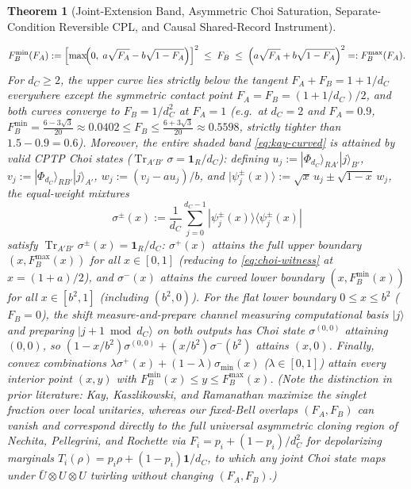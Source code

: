 \documentclass[11pt,a4paper]{article}
\newtheorem{theorem}{Theorem}
\theoremstyle{definition}
\theoremstyle{remark}
\newcommand{\Tr}{\operatorname{Tr}}
\newcommand{\1}{\mathbf{1}}
\begin{document}
\begin{theorem}[Joint-Extension Band, Asymmetric Choi Saturation, Separate-Condition Reversible CPL, and Causal Shared-Record Instrument]
\begin{enumerate}
  \begin{equation}\label{eq:kay-curved}
    F_B^{\min}(F_A) := \Bigl[\max\!\Bigl(0,\; a\sqrt{F_A} - b\sqrt{1 - F_A}\Bigr)\Bigr]^2
    \;\le\; F_B \;\le\;
    \Bigl(a\sqrt{F_A} + b\sqrt{1 - F_A}\Bigr)^2 =: F_B^{\max}(F_A).
  \end{equation}
  For $d_C \ge 2$, the upper curve lies strictly below the tangent $F_A + F_B = 1 + 1/d_C$ everywhere except the symmetric contact point $F_A = F_B = (1+1/d_C)/2$, and both curves converge to $F_B = 1/d_C^2$ at $F_A = 1$ (e.g.\ at $d_C = 2$ and $F_A = 0.9$, $F_B^{\min} = \frac{6-3\sqrt{3}}{20} \approx 0.0402 \le F_B \le \frac{6+3\sqrt{3}}{20} \approx 0.5598$, strictly tighter than $1.5 - 0.9 = 0.6$). Moreover, the \emph{entire} shaded band \eqref{eq:kay-curved} is attained by valid CPTP Choi states ($\Tr_{A'B'}\sigma = \1_R/d_C$): defining $u_j := |\Phi_{d_C}\rangle_{RA'}|j\rangle_{B'}$, $v_j := |\Phi_{d_C}\rangle_{RB'}|j\rangle_{A'}$, $w_j := (v_j - a u_j)/b$, and $|\psi_j^\pm(x)\rangle := \sqrt{x}\,u_j \pm \sqrt{1-x}\,w_j$, the equal-weight mixtures
  \begin{equation}\label{eq:asym-choi}
    \sigma^\pm(x) := \frac{1}{d_C}\sum_{j=0}^{d_C-1} |\psi_j^\pm(x)\rangle\langle\psi_j^\pm(x)|
  \end{equation}
  satisfy $\Tr_{A'B'}\sigma^\pm(x) = \1_R/d_C$: $\sigma^+(x)$ attains the full upper boundary $(x, F_B^{\max}(x))$ for all $x\in[0,1]$ (reducing to \eqref{eq:choi-witness} at $x=(1+a)/2$), and $\sigma^-(x)$ attains the curved lower boundary $(x, F_B^{\min}(x))$ for all $x\in[b^2,1]$ (including $(b^2,0)$). For the flat lower boundary $0\le x\le b^2$ ($F_B=0$), the shift measure-and-prepare channel measuring computational basis $|j\rangle$ and preparing $|j+1\bmod d_C\rangle$ on both outputs has Choi state $\sigma^{(0,0)}$ attaining $(0,0)$, so $(1-x/b^2)\sigma^{(0,0)} + (x/b^2)\sigma^-(b^2)$ attains $(x,0)$. Finally, convex combinations $\lambda\sigma^+(x) + (1-\lambda)\sigma_{\min}(x)$ ($\lambda\in[0,1]$) attain every interior point $(x,y)$ with $F_B^{\min}(x)\le y\le F_B^{\max}(x)$. (Note the distinction in prior literature: Kay, Kaszlikowski, and Ramanathan \cite[Eq.~(6), Fig.~1]{Kay2009} maximize the singlet fraction over local unitaries, whereas our fixed-Bell overlaps $(F_A,F_B)$ can vanish and correspond directly to the full universal asymmetric cloning region of Nechita, Pellegrini, and Rochette \cite[\S 7, Theorem~6, Fig.~2]{Nechita2021} via $F_i = p_i + (1-p_i)/d_C^2$ for depolarizing marginals $T_i(\rho) = p_i\rho + (1-p_i)\1/d_C$, to which any joint Choi state maps under $\bar{U}\otimes U\otimes U$ twirling without changing $(F_A,F_B)$.)

\end{enumerate}
\end{theorem}
\end{document}
